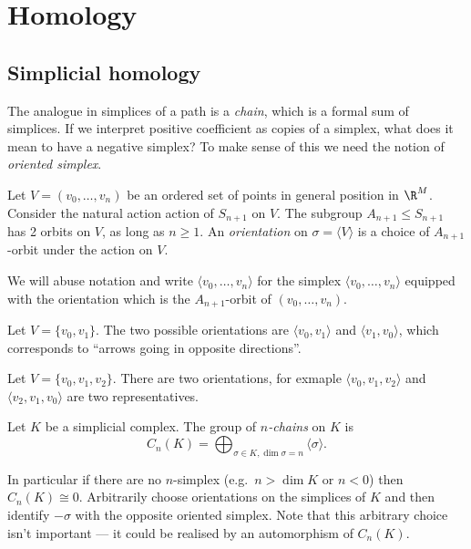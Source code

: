 \documentclass[a4paper]{article}
\begin{document}
\section{Homology}

\subsection{Simplicial homology}

The analogue in simplices of a path is a \emph{chain}, which is a formal sum of simplices. If we interpret positive coefficient as copies of a simplex, what does it mean to have a negative simplex? To make sense of this we need the notion of \emph{oriented simplex}.

\begin{definition}[orientation]
  Let \(V = (v_0, \dots, v_n)\) be an ordered set of points in general position in \(\R^M\). Consider the natural action action of \(S_{n + 1}\) on \(V\). The subgroup \(A_{n + 1} \leq S_{n + 1}\) has 2 orbits on \(V\), as long as \(n \geq 1\). An \emph{orientation} on \(\sigma = \langle V \rangle\) is a choice of \(A_{n + 1}\)-orbit under the action on \(V\).

  We will abuse notation and write \(\langle v_0, \dots, v_n \rangle\) for the simplex \(\langle v_0, \dots, v_n \rangle\) equipped with the orientation which is the \(A_{n + 1}\)-orbit of \((v_0, \dots, v_n)\).
\end{definition}

\begin{eg}
  Let \(V = \{v_0, v_1\}\). The two possible orientations are \(\langle v_0, v_1 \rangle\) and \(\langle v_1, v_0\rangle\), which corresponds to ``arrows going in opposite directions''.
\end{eg}

\begin{eg}
  Let \(V = \{v_0, v_1, v_2\}\). There are two orientations, for exmaple \(\langle v_0, v_1, v_2 \rangle\) and \(\langle v_2, v_1, v_0 \rangle\) are two representatives.
\end{eg}

\begin{definition}[chain]
  Let \(K\) be a simplicial complex. The group of \emph{\(n\)-chains} on \(K\) is
  \[
    C_n(K) = \bigoplus_{\sigma \in K, \dim \sigma = n} \langle \sigma \rangle.
  \]
\end{definition}

In particular if there are no \(n\)-simplex (e.g.\ \(n > \dim K\) or \(n < 0\)) then \(C_n(K) \cong 0\). Arbitrarily choose orientations on the simplices of \(K\) and then identify \(-\sigma\) with the opposite oriented simplex. Note that this arbitrary choice isn't important --- it could be realised by an automorphism of \(C_n(K)\).
\end{document}
